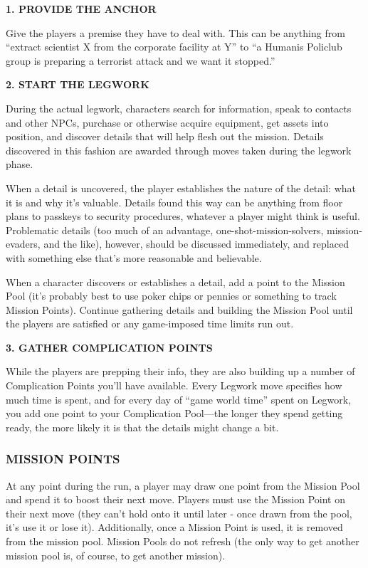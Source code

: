 \documentclass[oneside,10pt]{article}
\begin{document}
\begin{multicols}{2}
\textbf{1.  PROVIDE THE ANCHOR}

Give the players a premise they have to deal with. This can be
anything from “extract scientist X from the corporate facility
at Y” to “a Humanis Policlub group is preparing a terrorist
attack and we want it stopped.”

\textbf{2.  START THE LEGWORK}

During the actual legwork, characters search for information,
speak to contacts and other NPCs, purchase or otherwise acquire equipment, get assets into position, and discover details that will help flesh out the mission. Details discovered
in this fashion are awarded through moves taken during the
legwork phase.

When a detail is uncovered, the player establishes the nature of the detail: what it is and why it’s valuable.
Details found this way can be anything from floor plans to
passkeys to security procedures, whatever a player might
think is useful. Problematic details (too much of an advantage,
one-shot-mission-solvers, mission-evaders, and the like),
however, should be discussed immediately, and replaced
with something else that’s more reasonable and
believable.

When a character discovers or establishes a detail, add a point
to the Mission Pool (it’s probably best to use poker chips or
pennies or something to track Mission Points). Continue gathering details and building the Mission Pool until the players
are satisfied or any game-imposed time limits run
out.

\textbf{3.  GATHER COMPLICATION POINTS}

While the players are prepping their info, they are also building up a number of Complication Points you’ll have available. Every Legwork move specifies how much time is spent,
and for every day of “game world time” spent on Legwork,
you add one point to your Complication Pool—the longer
they spend getting ready, the more likely it is that the details
might change a bit.

\subsubsection{MISSION POINTS}
At any point during the run, a player may draw one point
from the Mission Pool and spend it to boost their next move.
Players must use the Mission Point on their next move (they
can’t hold onto it until later - once drawn from the pool, it’s
use it or lose it). Additionally, once a Mission Point is used, it
is removed from the mission pool. Mission Pools do not refresh (the only way to get another mission pool is, of course,
to get another mission).


\end{multicols}
\end{document}
